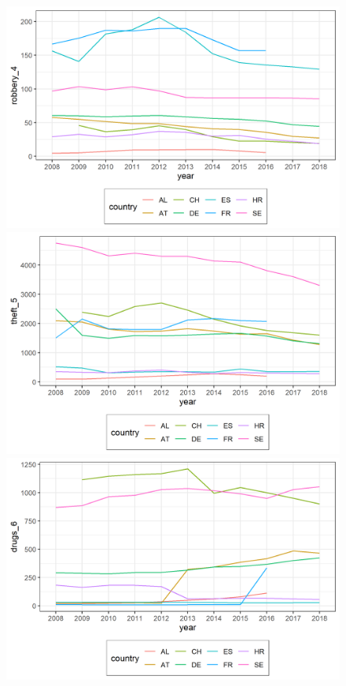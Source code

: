 \documentclass[a4paper,12pt]{article}
\begin{document}
\begin{figure}
\begin{minipage}{0.45\textwidth}
\end{minipage}
\begin{minipage}{0.45\textwidth}
  \includegraphics[trim={0 0 0 0},width=\linewidth]{charts/des_line_sexual_robbery_4_.png}
\end{minipage}
\begin{minipage}{0.45\textwidth}
  \includegraphics[trim={0 0 0 0},width=\linewidth]{charts/des_line_theft_5_.png}
\end{minipage}
\begin{minipage}{0.45\textwidth}
  \includegraphics[trim={0 0 0 0},width=\linewidth]{charts/des_line_drugs_6_.png}
\end{minipage}


\end{figure}
\end{document}
